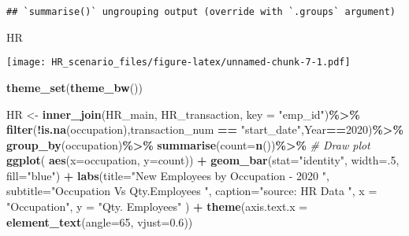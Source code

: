 \documentclass[
]{article}
\newenvironment{Shaded}{\begin{snugshade}}{\end{snugshade}}
\newcommand{\CommentTok}[1]{\textcolor[rgb]{0.56,0.35,0.01}{\textit{#1}}}
\newcommand{\DataTypeTok}[1]{\textcolor[rgb]{0.13,0.29,0.53}{#1}}
\newcommand{\DecValTok}[1]{\textcolor[rgb]{0.00,0.00,0.81}{#1}}
\newcommand{\FloatTok}[1]{\textcolor[rgb]{0.00,0.00,0.81}{#1}}
\newcommand{\KeywordTok}[1]{\textcolor[rgb]{0.13,0.29,0.53}{\textbf{#1}}}
\newcommand{\NormalTok}[1]{#1}
\newcommand{\OperatorTok}[1]{\textcolor[rgb]{0.81,0.36,0.00}{\textbf{#1}}}
\newcommand{\StringTok}[1]{\textcolor[rgb]{0.31,0.60,0.02}{#1}}
\begin{document}
\begin{verbatim}
## `summarise()` ungrouping output (override with `.groups` argument)
\end{verbatim}

\begin{Shaded}
\begin{Highlighting}[]
\NormalTok{HR}
\end{Highlighting}
\end{Shaded}

\texttt{[image: HR\_scenario\_files/figure-latex/unnamed-chunk-7-1.pdf]}

\begin{Shaded}
\begin{Highlighting}[]
\KeywordTok{theme\_set}\NormalTok{(}\KeywordTok{theme\_bw}\NormalTok{())}

\NormalTok{HR \textless{}{-}}\StringTok{ }\KeywordTok{inner\_join}\NormalTok{(HR\_main, HR\_transaction, }\DataTypeTok{key =} \StringTok{"emp\_id"}\NormalTok{)}\OperatorTok{\%\textgreater{}\%}
\KeywordTok{filter}\NormalTok{(}\OperatorTok{!}\KeywordTok{is.na}\NormalTok{(occupation),transaction\_num }\OperatorTok{==}\StringTok{ "start\_date"}\NormalTok{,Year}\OperatorTok{==}\DecValTok{2020}\NormalTok{)}\OperatorTok{\%\textgreater{}\%}
\StringTok{   }\KeywordTok{group\_by}\NormalTok{(}\StringTok{\textasciigrave{}}\DataTypeTok{occupation}\StringTok{\textasciigrave{}}\NormalTok{)}\OperatorTok{\%\textgreater{}\%}
\StringTok{   }\KeywordTok{summarise}\NormalTok{(}\DataTypeTok{count=}\KeywordTok{n}\NormalTok{())}\OperatorTok{\%\textgreater{}\%}
\StringTok{   }\CommentTok{\# Draw plot}
\StringTok{  }\KeywordTok{ggplot}\NormalTok{( }\KeywordTok{aes}\NormalTok{(}\DataTypeTok{x=}\NormalTok{occupation, }\DataTypeTok{y=}\NormalTok{count)) }\OperatorTok{+}\StringTok{ }
\StringTok{  }\KeywordTok{geom\_bar}\NormalTok{(}\DataTypeTok{stat=}\StringTok{"identity"}\NormalTok{, }\DataTypeTok{width=}\NormalTok{.}\DecValTok{5}\NormalTok{, }\DataTypeTok{fill=}\StringTok{"blue"}\NormalTok{) }\OperatorTok{+}\StringTok{ }
\StringTok{  }\KeywordTok{labs}\NormalTok{(}\DataTypeTok{title=}\StringTok{"New Employees by Occupation {-} 2020 "}\NormalTok{, }
       \DataTypeTok{subtitle=}\StringTok{"Occupation Vs Qty.Employees "}\NormalTok{, }
       \DataTypeTok{caption=}\StringTok{"source: HR Data "}\NormalTok{,}
       \DataTypeTok{x =} \StringTok{"Occupation"}\NormalTok{, }\DataTypeTok{y =} \StringTok{"Qty. Employees"}\NormalTok{ ) }\OperatorTok{+}\StringTok{ }
\StringTok{  }\KeywordTok{theme}\NormalTok{(}\DataTypeTok{axis.text.x =} \KeywordTok{element\_text}\NormalTok{(}\DataTypeTok{angle=}\DecValTok{65}\NormalTok{, }\DataTypeTok{vjust=}\FloatTok{0.6}\NormalTok{))}
\end{Highlighting}
\end{Shaded}
\end{document}
